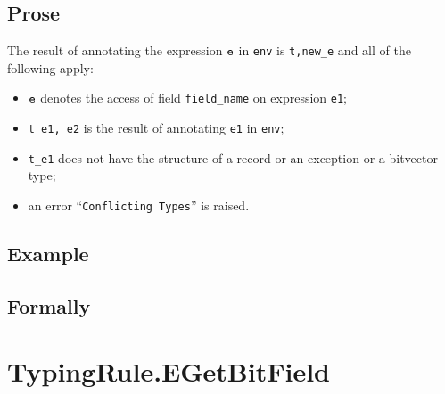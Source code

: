 \documentclass{book}
\begin{document}
\begin{itemize}
 \subsection{Prose}
  The result of annotating the expression $\texttt{e}$ in \texttt{env} is
\texttt{t,new\_e} and all of the following apply:
   \begin{itemize}
   \item $\texttt{e}$ denotes the access of field \texttt{field\_name} on expression \texttt{e1};
   \item \texttt{t\_e1, e2} is the result of annotating \texttt{e1} in \texttt{env};
   \item \texttt{t\_e1} does not have the structure of a record or an exception or a bitvector type;
   \item an error ``\texttt{Conflicting Types}'' is raised.
   \end{itemize}

 \subsection{Example}



\begin{emptyformal}
    \subsection{Formally}

\end{emptyformal}


\section{TypingRule.EGetBitField \label{sec:TypingRule.EGetBitField}}


\end{itemize}
\end{document}
